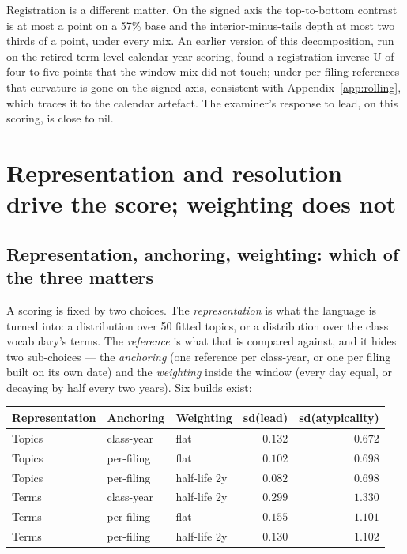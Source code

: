 \documentclass[11pt]{article}
\begin{document}
Registration is a different matter. On the signed axis the top-to-bottom
contrast is at most a point on a 57\% base and the interior-minus-tails
depth at most two thirds of a point, under every mix. An earlier version of
this decomposition, run on the retired term-level calendar-year scoring,
found a registration inverse-U of four to five points that the window mix
did not touch; under per-filing references that curvature is gone on the
signed axis, consistent with Appendix~\ref{app:rolling}, which traces it to
the calendar artefact. The examiner's response to lead, on this scoring, is
close to nil.

\section{Representation and resolution drive the score; weighting does not}\label{app:choices}

\subsection{Representation, anchoring, weighting: which of the three matters}

A scoring is fixed by two choices. The \emph{representation} is what the
language is turned into: a distribution over 50 fitted topics, or a
distribution over the class vocabulary's terms. The \emph{reference} is what
that is compared against, and it hides two sub-choices --- the
\emph{anchoring} (one reference per class-year, or one per filing built on its
own date) and the \emph{weighting} inside the window (every day equal, or
decaying by half every two years). Six builds exist:

\begin{center}\small
\begin{tabular}{lllrr}
\toprule
Representation & Anchoring & Weighting & sd(lead) & sd(atypicality) \\
\midrule
Topics & class-year & flat          & $0.132$ & $0.672$ \\
Topics & per-filing & flat          & $0.102$ & $0.698$ \\
Topics & per-filing & half-life 2y  & $0.082$ & $0.698$ \\
Terms  & class-year & half-life 2y  & $0.299$ & $1.330$ \\
Terms  & per-filing & flat          & $0.155$ & $1.101$ \\
Terms  & per-filing & half-life 2y  & $0.130$ & $1.102$ \\
\bottomrule
\end{tabular}
\end{center}
\end{document}
